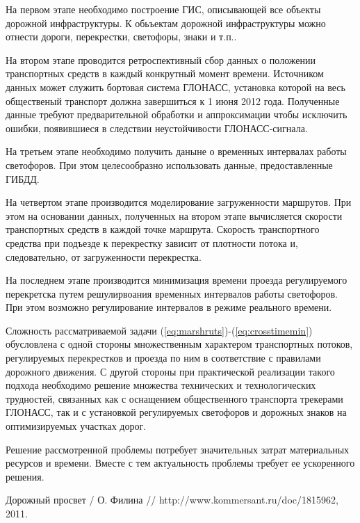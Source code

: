 \documentclass[a4paper,13pt]{article}
\begin{document}
На первом этапе необходимо построение ГИС, описывающей все объекты дорожной инфраструктуры. К обьъектам дорожной инфраструктуры можно отнести дороги, перекрестки, светофоры, знаки и т.п..

На втором этапе проводится ретроспективный сбор данных о положении транспортных средств в каждый конкрутный момент времени. Источником данных может служить бортовая система ГЛОНАСС, установка которой на весь общественый транспорт должна завершиться к 1 июня 2012 года. Полученные данные требуют предварительной обработки и аппроксимации чтобы исключить ошибки, появившиеся в следствии неустойчивости ГЛОНАСС-сигнала.

На третьем этапе необходимо получить даныне о временных интервалах работы светофоров. При этом целесообразно использовать данные, предоставленные ГИБДД.

На четвертом этапе производится моделирование загруженности маршрутов. При этом на основании данных, полученных на втором этапе вычисляется скорости транспортных средств в каждой точке маршрута. Скорость транспортного средства при подъезде к перекрестку зависит от плотности потока и, следовательно, от загруженности перекрестка. 

На последнем этапе производится минимизация времени проезда регулируемого перекретска путем решулирвоания временных интервалов работы светофоров. При этом возможно регулирование интервалов в режиме реального времени.

Сложность рассматриваемой задачи (\ref{eq:marshruts})-(\ref{eq:crosstimemin}) обусловлена с одной стороны множественным характером транспортных потоков, регулируемых перекрестков и проезда по ним в соответствие с правилами дорожного движения. С другой стороны при практической реализации такого подхода необходимо решение множества технических и технологических трудностей, связанных как с оснащением общественного транспорта трекерами ГЛОНАСС, так и с установкой регулируемых светофоров и дорожных знаков на оптимизируемых участках дорог.

Решение рассмотренной проблемы потребует значительных затрат материальных ресурсов и времени. Вместе с тем актуальность проблемы требует ее ускоренного решения.

\begin{thebibliography}{1}
Дорожный просвет / О. Филина // http://www.kommersant.ru/doc/1815962, 2011.
\end{thebibliography}
\end{document}
